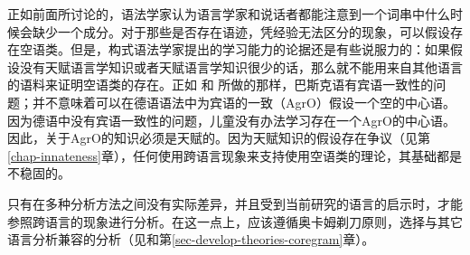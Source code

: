 正如前面所讨论的，语法学家认为语言学家和说话者都能注意到一个词串中什么时候会缺少一个成分。对于那些是否存在语迹，凭经验无法区分的现象，可以假设存在空语类。但是，构式语法学家提出的学习能力的论据还是有些说服力的：如果假设没有天赋语言学知识或者天赋语言学知识很少的话，那么就不能用来自其他语言的语料来证明空语类的存在。正如 \citet{Stechow96a}和 \citet{Meinunger2000a}所做的那样，巴斯克语有宾语一致性的问题；并不意味着可以在德语语法中为宾语的一致（AgrO）假设一个空的中心语。因为德语中没有宾语一致性的问题，儿童没有办法学习存在一个AgrO的中心语。因此，关于AgrO的知识必须是天赋的。因为天赋知识的假设存在争议（见第\ref{chap-innateness}章），任何使用跨语言现象来支持使用空语类的理论，其基础都是不稳固的。

只有在多种分析方法之间没有实际差异，并且受到当前研究的语言的启示时，才能参照跨语言的现象进行分析。在这一点上，应该遵循奥卡姆剃刀原则，选择与其它语言分析兼容的分析（见\citealp{MuellerCoreGram}和第\ref{sec-develop-theories-coregram}章）。

